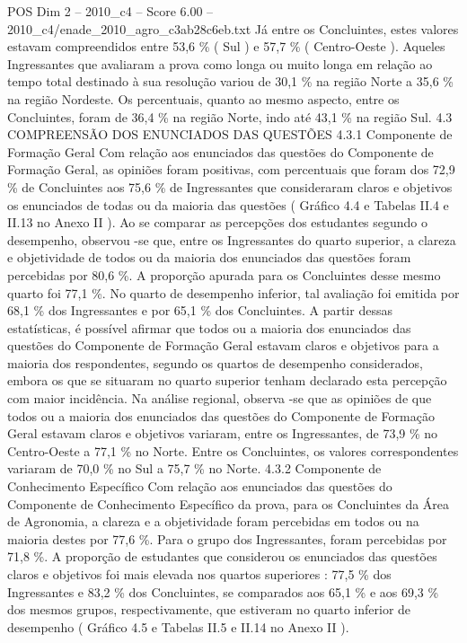 \begin{textsample}{POS Dim 2 – 2010\_c4 – Score 6.00 – 2010\_c4/enade\_2010\_agro\_c3ab28c6eb.txt}
Já entre os Concluintes, estes valores estavam compreendidos entre 53,6 \% ( Sul ) e 57,7 \% ( Centro-Oeste ).
Aqueles Ingressantes que avaliaram a prova como longa ou muito longa em relação ao tempo total destinado à sua resolução variou de 30,1 \% na região Norte a 35,6 \% na região Nordeste.
Os percentuais, quanto ao mesmo aspecto, entre os Concluintes, foram de 36,4 \% na região Norte, indo até 43,1 \% na região Sul. 4.3 COMPREENSÃO DOS ENUNCIADOS DAS QUESTÕES 4.3.1 Componente de Formação Geral Com relação aos enunciados das questões do Componente de Formação Geral, as opiniões foram positivas, com percentuais que foram dos 72,9 \% de Concluintes aos 75,6 \% de Ingressantes que consideraram claros e objetivos os enunciados de todas ou da maioria das questões ( Gráfico 4.4 e Tabelas II.4 e II.13 no Anexo II ).
Ao se comparar as percepções dos estudantes segundo o desempenho, observou -se que, entre os Ingressantes do quarto superior, a clareza e objetividade de todos ou da maioria dos enunciados das questões foram percebidas por 80,6 \%.
A proporção apurada para os Concluintes desse mesmo quarto foi 77,1 \%.
No quarto de desempenho inferior, tal avaliação foi emitida por 68,1 \% dos Ingressantes e por 65,1 \% dos Concluintes.
A partir dessas estatísticas, é possível afirmar que todos ou a maioria dos enunciados das questões do Componente de Formação Geral estavam claros e objetivos para a maioria dos respondentes, segundo os quartos de desempenho considerados, embora os que se situaram no quarto superior tenham declarado esta percepção com maior incidência.
Na análise regional, observa -se que as opiniões de que todos ou a maioria dos enunciados das questões do Componente de Formação Geral estavam claros e objetivos variaram, entre os Ingressantes, de 73,9 \% no Centro-Oeste a 77,1 \% no Norte.
Entre os Concluintes, os valores correspondentes variaram de 70,0 \% no Sul a 75,7 \% no Norte. 4.3.2 Componente de Conhecimento Específico Com relação aos enunciados das questões do Componente de Conhecimento Específico da prova, para os Concluintes da Área de Agronomia, a clareza e a objetividade foram percebidas em todos ou na maioria destes por 77,6 \%.
Para o grupo dos Ingressantes, foram percebidas por 71,8 \%.
A proporção de estudantes que considerou os enunciados das questões claros e objetivos foi mais elevada nos quartos superiores : 77,5 \% dos Ingressantes e 83,2 \% dos Concluintes, se comparados aos 65,1 \% e aos 69,3 \% dos mesmos grupos, respectivamente, que estiveram no quarto inferior de desempenho ( Gráfico 4.5 e Tabelas II.5 e II.14 no Anexo II ).

\end{textsample}
